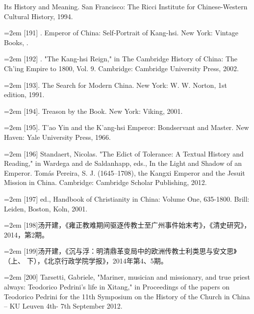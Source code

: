 \space%
Its History and Meaning. San Francisco: The Ricci Institute for Chinese-Western%
\space%
Cultural History, 1994.%
\par
\noindent\hangindent=2em
[191] . Emperor of China: Self-Portrait of Kang-hsi. New York: Vintage Books,%
.%
\par
\noindent\hangindent=2em
[192] . "The Kang-hsi Reign," in The Cambridge History of China: The Ch'ing%
\space%
Empire to 1800, Vol. 9. Cambridge: Cambridge University Press, 2002.%
\par
\noindent\hangindent=2em
[193]. The Search for Modern China. New York: W. W. Norton, 1st edition, 1991.%
\par
\noindent\hangindent=2em
[194]. Treason by the Book. New York: Viking, 2001.%
\par
\noindent\hangindent=2em
[195]. T’ao Yin and the K'ang-hsi Emperor: Bondservant and Master. New Haven:%
\space%
Yale University Press, 1966.%
\par
\noindent\hangindent=2em
[196] Standaert, Nicolas. "The Edict of Tolerance: A Textual History and Reading," in%
\space%
Wardega and de Saldanhapp, eds., In the Light and Shadow of an Emperor. Tomás%
\space%
Pereira, S. J. (1645–1708), the Kangxi Emperor and the Jesuit Mission in China.%
\space%
Cambridge: Cambridge Scholar Publishing, 2012.%
\par
\noindent\hangindent=2em
[197]  ed., Handbook of Christianity in China: Volume One, 635-1800. Brill:%
\space%
Leiden, Boston, Koln, 2001.%
\par
\noindent\hangindent=2em
[198]汤开建，《雍正教难期间驱逐传教士至广州事件始末考》，《清史研究》，%
2014，第2期。%
\par
\noindent\hangindent=2em
[199]汤开建，《沉与浮：明清鼎革变局中的欧洲传教士利类思与安文思》（上、%
下），《北京行政学院学报》，2014年第4、5期。%
\par
\noindent\hangindent=2em
[200] Tarsetti, Gabriele, "Mariner, musician and missionary, and true priest always:%
\space%
Teodorico Pedrini's life in Xitang," in Proceedings of the papers on Teodorico Pedrini%
\space%
for the 11th Symposium on the History of the Church in China – KU Leuven 4th-%
7th September 2012.%
